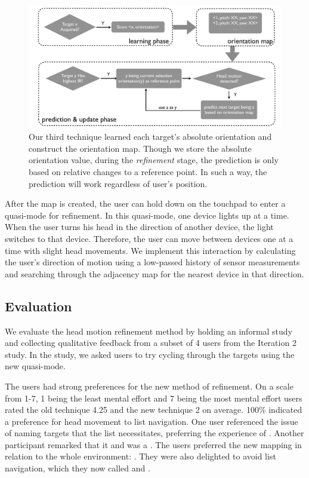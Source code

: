 \begin{figure}[t]
\centering
\includegraphics[width=1\columnwidth]{figures/third_technique3.pdf}
\caption{ Our third technique learned each target's absolute orientation and construct the orientation map. Though we store the absolute orientation value, during the {\em refinement} stage, the prediction is only based on relative changes to a reference point. In such a way, the prediction will work regardless of user's position.}
\label{fig:third_technique}
\end{figure}

After the map is created, the user can hold down on the touchpad to enter a
quasi-mode for refinement. In this quasi-mode, one device lights up at a time. When the user turns his head in the direction of another device, the light switches to that device. Therefore, the user can move between devices one at a time with slight head movements. We implement this interaction by calculating the user's direction of motion using a low-passed history of sensor measurements and searching through the adjacency map for
the nearest device in that direction. 

\subsection{Evaluation}
We evaluate the head motion refinement method by holding an informal study and collecting qualitative feedback from a subset of 4 users from the Iteration 2 study. In the study, we asked users to try cycling through the targets using the new quasi-mode.

The users had strong preferences for the new method of refinement. On a scale from 1-7, 1 being the least mental effort and 7 being the most mental effort users rated the old technique 4.25 and the new technique 2 on average. 100\% indicated a preference for head movement to list navigation. One user referenced the issue of naming targets that the list necessitates, preferring the experience of . Another participant remarked that it  and was a . The users preferred the new mapping in relation to the whole environment: . They were also delighted to avoid list navigation, which they now called  and .